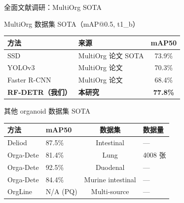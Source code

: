 \documentclass[aspectratio=169, 10pt]{beamer}
\begin{document}
\begin{frame}{全面文献调研：MultiOrg SOTA}
  \begin{block}{MultiOrg 数据集 SOTA（mAP@0.5, t1\_b）}
    \begin{tabular}{llc}
      \toprule
      方法 & 来源 & mAP50 \\
      \midrule
      SSD & MultiOrg 论文 SOTA & 73.9\% \\
      YOLOv3 & MultiOrg 论文 & 70.3\% \\
      Faster R-CNN & MultiOrg 论文 & 68.4\% \\
      \textbf{RF-DETR（我们）} & \textbf{本研究} & \textbf{77.8\%} \\
      \bottomrule
    \end{tabular}
  \end{block}
  \begin{block}{其他 organoid 数据集 SOTA}
    \begin{tabular}{llcl}
      \toprule
      方法 & mAP50 & 数据集 & 数据量 \\
      \midrule
      Deliod & 87.5\% & Intestinal & — \\
      Orga-Dete & 81.4\% & Lung & 4008 张 \\
      Orga-Dete & 92.5\% & Duodenal & — \\
      Orga-Dete & 84.4\% & Murine intestinal & — \\
      OrgLine & N/A (PQ) & Multi-source & — \\
      \bottomrule
    \end{tabular}
  \end{block}
\end{frame}
\end{document}
